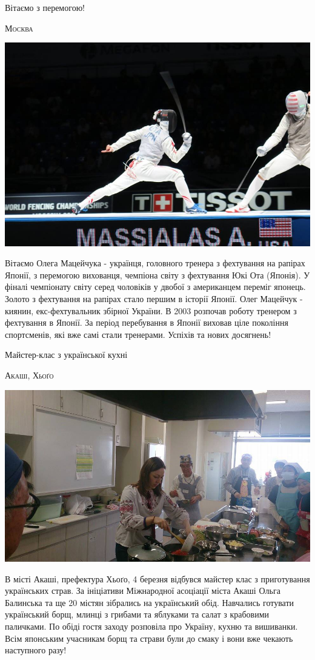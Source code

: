 \documentclass[10pt,a4paper]{article}
\newcommand{\NewsItem}[1]{%
		\usefont{T2A}{iwona}{m}{n} 
		\large #1 \vspace{4pt}
		\par \normalsize \normalfont}
\newcommand{\NewsAuthor}[1]{%
			\hfill \textsc{#1} \vspace{4pt}
			\par \normalfont}
\begin{document}
\begin{multicols}{3}
\vspace{4cm}
	\NewsItem{Вітаємо з перемогою!}
	\NewsAuthor{Москва}
		\begin{center}
			\includegraphics[width=0.8\linewidth]{images/rapiry}
		\end{center}
Вітаємо Олега Мацейчука - українця, головного тренера з фехтування на рапірах Японії, з перемогою вихованця, чемпіона світу з фехтування Юкі Ота (Японія). 
У фіналі чемпіонату світу серед чоловіків у двобої з американцем переміг японець. Золото з фехтування на рапірах стало першим в історії Японії.
Олег Мацейчук - киянин, екс-фехтувальник збірної України. В 2003 розпочав роботу тренером з фехтування в Японії. За період перебування в Японії виховав ціле покоління спортсменів, які вже самі стали тренерами.
Успіхів та нових досягнень!

\vspace{1cm}
\NewsItem{Майстер-клас з української кухні}
\NewsAuthor{Акаші, Хьоґо}
		\begin{center}
			\includegraphics[width=0.8\linewidth]{images/ukr-cuisine-akashi}
		\end{center}
В місті Акаші, префектура Хьоґо, 4 березня відбувся майстер клас з приготування українських страв. За ініціативи Міжнародної асоціації міста Акаші Ольга Балинська та ще 20 містян зібрались на український обід. Навчались готувати український борщ, млинці з грибами та яблуками та салат з крабовими паличками. По обіді гостя заходу розповіла про Україну, кухню та вишиванки. Всім японським учасникам борщ та страви були до смаку і вони вже чекають наступного разу!


\end{multicols}
\end{document}
